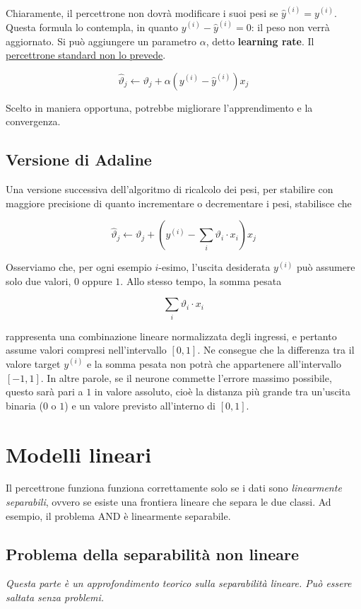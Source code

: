 Chiaramente, il percettrone non dovrà modificare i suoi pesi se $\hat{y}^{(i)} = y^{(i)}$. Questa formula lo contempla, in quanto $y^{(i)} - \hat{y}^{(i)} = 0$: il peso non verrà aggiornato. 
Si può aggiungere un parametro $\alpha$, detto \textbf{learning rate}. Il \underline{percettrone standard non lo prevede}.

$$
\hat{\vartheta}_j \leftarrow \vartheta_j + \alpha( y^{(i)} -\hat{y}^{(i)})x_j
$$

\noindent
Scelto in maniera opportuna, potrebbe migliorare l'apprendimento e la convergenza.

\subsection{Versione di Adaline}

Una versione successiva dell'algoritmo di ricalcolo dei pesi, per stabilire con maggiore precisione di quanto incrementare o decrementare i pesi, stabilisce che

$$
\hat{\vartheta}_j \leftarrow \vartheta_j + \left( y^{(i)} - \sum_{i}\vartheta_i \cdot x_i\right)x_j
$$

\noindent
Osserviamo che, per ogni esempio $i$-esimo, l'uscita desiderata $y^{(i)}$ può assumere solo due valori, $0$ oppure $1$. Allo stesso tempo, la somma pesata 

\[
\sum_i \vartheta_i \cdot x_i
\]

\noindent
rappresenta una combinazione lineare normalizzata degli ingressi, e pertanto assume valori compresi nell'intervallo $[0,1]$.  Ne consegue che la differenza tra il valore target $y^{(i)}$ e la somma pesata non potrà che appartenere all’intervallo $[-1,1]$. In altre parole, se il neurone commette l’errore massimo possibile, questo sarà pari a $1$ in valore assoluto, cioè la distanza più grande tra un’uscita binaria ($0$ o $1$) e un valore previsto all’interno di $[0,1]$.

\section{Modelli lineari}
Il percettrone funziona funziona correttamente solo se i dati sono \emph{linearmente separabili}, ovvero se esiste una frontiera lineare che separa le due classi. Ad esempio, il problema AND è linearmente separabile.

\subsection{Problema della separabilità non lineare}
\it{Questa parte è un approfondimento teorico sulla separabilità lineare. Può essere saltata senza problemi.}

